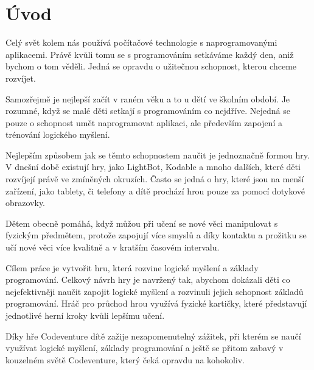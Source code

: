 \chapter{Úvod}

Celý svět kolem nás používá počítačové technologie s naprogramovanými aplikacemi. Právě kvůli tomu se s programováním setkáváme každý den, aniž bychom o tom věděli. Jedná se opravdu o užitečnou schopnost, kterou chceme rozvíjet.\par
Samozřejmě je nejlepší začít v raném věku a to u dětí ve školním období. Je rozumné, když se malé děti setkají s programováním co nejdříve. Nejedná se pouze o schopnost umět naprogramovat aplikaci, ale především zapojení a trénování logického myšlení.\par
Nejlepším způsobem jak se těmto schopnostem naučit je jednoznačně formou hry. V dnešní době existují hry, jako LightBot, Kodable a mnoho dalších, které děti rozvíjejí právě ve zmíněných okruzích. Často se jedná o hry, které jsou na menší zařízení, jako tablety, či telefony a dítě prochází hrou pouze za pomocí dotykové obrazovky.\par
Dětem obecně pomáhá, když můžou při učení se nové věci manipulovat s fyzickým předmětem, protože zapojují více smyslů a díky kontaktu a prožitku se učí nové věci více kvalitně a v kratším časovém intervalu.\par
Cílem práce je vytvořit hru, která rozvine logické myšlení a základy programování. Celkový návrh hry je navržený tak, abychom dokázali děti co nejefektivněji naučit zapojit logické myšlení a rozvinuli jejich schopnost základů programování. Hráč pro průchod hrou využívá fyzické kartičky, které představují jednotlivé herní kroky kvůli lepšímu učení.\par
Díky hře Codeventure dítě zažije nezapomenutelný zážitek, při kterém se naučí využívat logické myšlení, základy programování a ještě se přitom zabavý v kouzelném světě Codeventure, který čeká opravdu na kohokoliv.